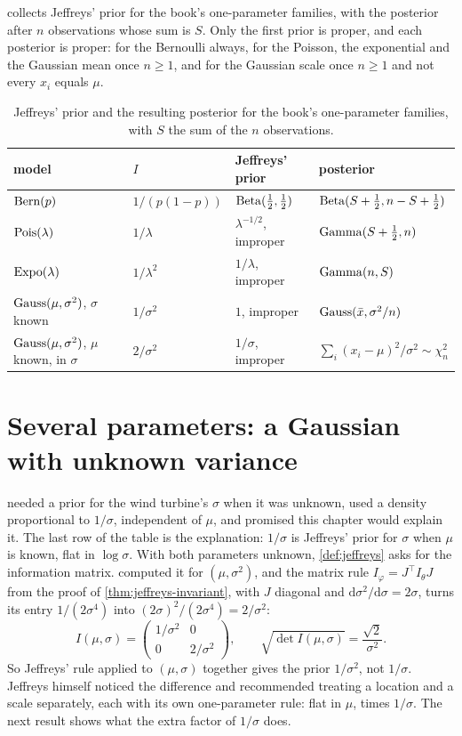  collects Jeffreys' prior for the book's one-parameter families, with the posterior after $n$ observations whose sum is $S$.
Only the first prior is proper, and each posterior is proper: for the Bernoulli always, for the Poisson, the exponential and the Gaussian mean once $n \geq 1$, and for the Gaussian scale once $n \geq 1$ and not every $x_i$ equals $\mu$.

\begin{table}[htbp]
\centering
\small
\begin{tabular}{@{}llll@{}}
\toprule
model & $I$ & Jeffreys' prior & posterior \\
\midrule
$\text{Bern}(p)$ & $1/(p(1-p))$ & $\mathrm{Beta}(\frac12, \frac12)$ & $\mathrm{Beta}(S + \frac12, n - S + \frac12)$ \\[2pt]
$\text{Pois}(\lambda)$ & $1/\lambda$ & $\lambda^{-1/2}$, improper & $\mathrm{Gamma}(S + \frac12, n)$ \\[2pt]
$\text{Expo}(\lambda)$ & $1/\lambda^2$ & $1/\lambda$, improper & $\mathrm{Gamma}(n, S)$ \\[2pt]
$\text{Gauss}(\mu, \sigma^2)$, $\sigma$ known & $1/\sigma^2$ & $1$, improper & $\text{Gauss}(\bar{x}, \sigma^2/n)$ \\[2pt]
$\text{Gauss}(\mu, \sigma^2)$, $\mu$ known, in $\sigma$ & $2/\sigma^2$ & $1/\sigma$, improper & $\sum_i(x_i - \mu)^2/\sigma^2 \sim \chi^2_n$ \\
\bottomrule
\end{tabular}
\caption{Jeffreys' prior and the resulting posterior for the book's one-parameter families, with $S$ the sum of the $n$ observations.}
\label{tab:jeffreys}
\end{table}

\section{Several parameters: a Gaussian with unknown variance}
\label{sec:jeff-several}

 needed a prior for the wind turbine's $\sigma$ when it was unknown, used a density proportional to $1/\sigma$, independent of $\mu$, and promised this chapter would explain it.
The last row of the table is the explanation: $1/\sigma$ is Jeffreys' prior for $\sigma$ when $\mu$ is known, flat in $\log\sigma$.
With both parameters unknown, \cref{def:jeffreys} asks for the information matrix.
 computed it for $(\mu, \sigma^2)$, and the matrix rule $I_\varphi = J^\top I_\theta J$ from the proof of \cref{thm:jeffreys-invariant}, with $J$ diagonal and $\mathrm{d}\sigma^2/\mathrm{d}\sigma = 2\sigma$, turns its entry $1/(2\sigma^4)$ into $(2\sigma)^2/(2\sigma^4) = 2/\sigma^2$:
\[
I(\mu, \sigma) = \begin{pmatrix} 1/\sigma^2 & 0 \\ 0 & 2/\sigma^2 \end{pmatrix}, \qquad \sqrt{\det I(\mu, \sigma)} = \frac{\sqrt{2}}{\sigma^2}.
\]
So Jeffreys' rule applied to $(\mu, \sigma)$ together gives the prior $1/\sigma^2$, not $1/\sigma$.
Jeffreys himself noticed the difference and recommended treating a location and a scale separately, each with its own one-parameter rule: flat in $\mu$, times $1/\sigma$.
The next result shows what the extra factor of $1/\sigma$ does.

